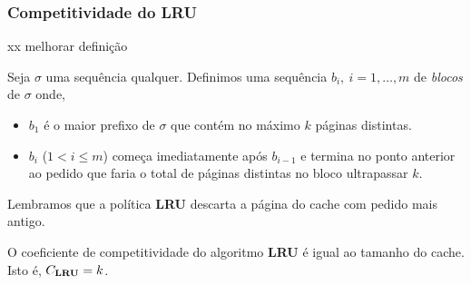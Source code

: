 \subsubsection{Competitividade do LRU}

\begin{definition}

  xx melhorar definição

  Seja \(\sigma\) uma sequência qualquer. Definimos uma sequência \(b_i, \ i = 1, \dots, m\) de \emph{blocos} de \(\sigma\) onde,
\begin{itemize}
    \item \(b_1\) é o maior prefixo de \(\sigma\) que contém no máximo \(k\) páginas distintas.
    \item \(b_i\) (\(1 < i \le m\)) começa imediatamente após \(b_{i-1}\) e termina no ponto anterior ao pedido que faria o total de páginas distintas no bloco ultrapassar \(k\). 
\end{itemize}

\end{definition}

Lembramos que a política \textbf{LRU} descarta a página do cache com pedido mais antigo. 

\begin{theorem}
  O coeficiente de competitividade do algoritmo \textbf{LRU} é igual ao tamanho do cache. Isto é, \(C_{\bold{LRU}} = k\).
\end{theorem}

